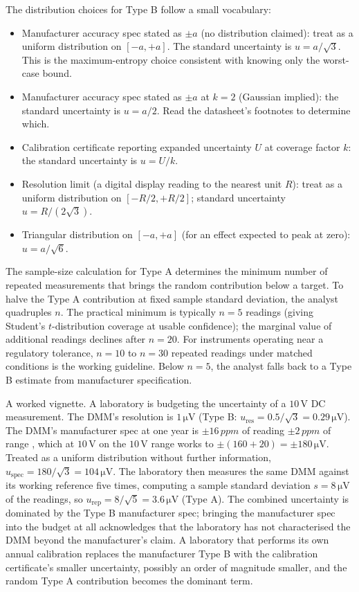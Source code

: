 The distribution choices for Type B follow a small vocabulary:

\begin{itemize}[leftmargin=*]
  \item Manufacturer accuracy spec stated as $\pm a$ (no
    distribution claimed): treat as a uniform distribution on
    $[-a, +a]$. The standard uncertainty is $u = a/\sqrt{3}$.
    This is the maximum-entropy choice consistent with knowing
    only the worst-case bound.
  \item Manufacturer accuracy spec stated as $\pm a$ at $k = 2$
    (Gaussian implied): the standard uncertainty is $u = a/2$.
    Read the datasheet's footnotes to determine which.
  \item Calibration certificate reporting expanded uncertainty
    $U$ at coverage factor $k$: the standard uncertainty is
    $u = U/k$.
  \item Resolution limit (a digital display reading to the nearest
    unit $R$): treat as a uniform distribution on $[-R/2, +R/2]$;
    standard uncertainty $u = R/(2\sqrt{3})$.
  \item Triangular distribution on $[-a, +a]$ (for an effect
    expected to peak at zero): $u = a/\sqrt{6}$.
\end{itemize}

The sample-size calculation for Type A determines the minimum
number of repeated measurements that brings the random
contribution below a target. To halve the Type A contribution at
fixed sample standard deviation, the analyst quadruples $n$. The
practical minimum is typically $n = 5$ readings (giving Student's
$t$-distribution coverage at usable confidence); the marginal value
of additional readings declines after $n = 20$. For instruments
operating near a regulatory tolerance, $n = 10$ to $n = 30$
repeated readings under matched conditions is the working
guideline. Below $n = 5$, the analyst falls back to a Type B
estimate from manufacturer specification.

A worked vignette. A laboratory is budgeting the uncertainty of a
$10\,\si{\volt}$ DC measurement. The DMM's resolution is
$1\,\si{\micro\volt}$ (Type B: $u_{\text{res}} = 0.5/\sqrt{3} =
0.29 \,\si{\micro\volt}$). The DMM's manufacturer spec at one year
is $\pm 16\,\si{ppm}$ of reading $\pm 2\,\si{ppm}$ of range
\cite{web:ch03t3-keysight-34470a}, which at $10\,\si{\volt}$ on
the $10\,\si{\volt}$ range works to $\pm (160 + 20) =
\pm 180\,\si{\micro\volt}$. Treated as a uniform distribution
without further information, $u_{\text{spec}} = 180/\sqrt{3} =
104 \,\si{\micro\volt}$. The laboratory then measures the same
DMM against its working reference five times, computing a sample
standard deviation $s = 8\,\si{\micro\volt}$ of the readings, so
$u_{\text{rep}} = 8/\sqrt{5} = 3.6 \,\si{\micro\volt}$ (Type A).
The combined uncertainty is dominated by the Type B manufacturer
spec; bringing the manufacturer spec into the budget at all
acknowledges that the laboratory has not characterised the DMM
beyond the manufacturer's claim. A laboratory that performs its
own annual calibration replaces the manufacturer Type B with the
calibration certificate's smaller uncertainty, possibly an order
of magnitude smaller, and the random Type A contribution becomes
the dominant term.

